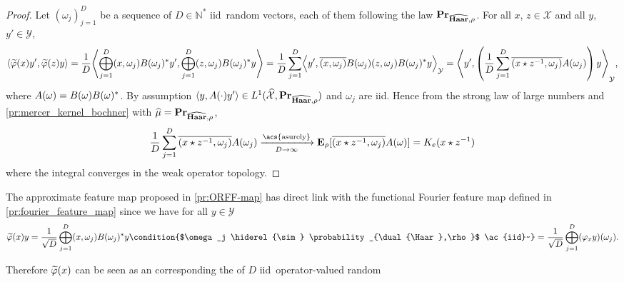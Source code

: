 \begin{proof}
    Let $(\omega_j)_{j=1}^D$ be a sequence of $D\in\mathbb{N}^*$
    \ac{iid}~random vectors, each of them following the law
    ${\mathbf{{Pr}}}_{\widehat{\mathbf{Haar}},\rho}$. For all $x$, $z \in \mathcal{X}$ and
    all $y$, $y' \in \mathcal{Y}$,
    \begin{dmath*}
        \inner*{\tildePhi{\omega}(x)y',\tildePhi{\omega}(z)y}
        =\frac{1}{D}\inner*{\Vect_{j=1}^D\pairing{x,
        \omega_j}B(\omega_j)^\adjoint y', \Vect_{j=1}^D\pairing{z,
        \omega_j}B(\omega_j)^\adjoint y}
        = \frac{1}{D} \sum_{j=1}^D \inner*{y', \conj{\pairing{x,
        \omega_j}}B(\omega_j)\pairing{z, \omega_j}B(\omega_j)^\adjoint
        y}_{\mathcal{Y}}
        = \inner*{y', \left(\frac{1}{D} \sum_{j=1}^D \conj{\pairing{x\groupop
        \inv{z}, \omega_j}}A(\omega_j)\right)y}_{\mathcal{Y}},
    \end{dmath*}
    where $A(\omega)=B(\omega)B(\omega)^* $. By assumption $\langle y,
    A(\cdot)y'\rangle\in L^1(\widehat{\mathcal{X}},{\mathbf{{Pr}}}_{\widehat{\mathbf{Haar}},\rho})$
    and $\omega_j$ are \ac{iid}. Hence from the strong law of large numbers and
    \cref{pr:mercer_kernel_bochner} with
    $\widehat{\mu}={\mathbf{{Pr}}}_{\widehat{\mathbf{Haar}},\rho}$,
    \begin{dmath*}
        \frac{1}{D} \sum_{j=1}^D
        \conj{\pairing{x\groupop\inv{z},\omega_j}} A(\omega_j)
        \converges{\acs{asurely}}{D \to \infty}
        \expectation_{\rho}[\conj{\pairing{x \groupop
        z^{-1}, \omega_j} }A(\omega)]
        =K_e(x\groupop\inv{z})
    \end{dmath*}
    where the integral converges in the weak operator topology.
\end{proof}
\begin{remark}
    The approximate feature map proposed in \cref{pr:ORFF-map} has direct link
    with the functional Fourier feature map defined in
    \cref{pr:fourier_feature_map} since we have for all $y\in\mathcal{Y}$
    \begin{dmath}
        \tildePhi{\omega}(x)y 
        = \frac{1}{\sqrt{D}}\Vect_{j=1}^D\pairing{x,
        \omega_j}B(\omega_j)^\adjoint y \condition{$\omega_j \hiderel{\sim}
        \probability_{\dual{\Haar},\rho}$ \ac{iid}~} 
        = \frac{1}{\sqrt{D}} \Vect_{j=1}^D (\Phi_x y)(\omega_j).
    \end{dmath}
\end{remark}
Therefore $\tildePhi{\omega}(x)$ can be seen as an 
corresponding the  of $D$ \ac{iid}~operator-valued random
